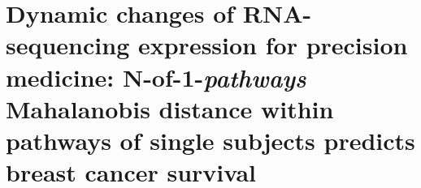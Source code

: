 \chapter{Dynamic changes of RNA-sequencing expression for precision medicine: N-of-1-\emph{pathways} Mahalanobis distance within pathways of single subjects predicts breast cancer survival}
